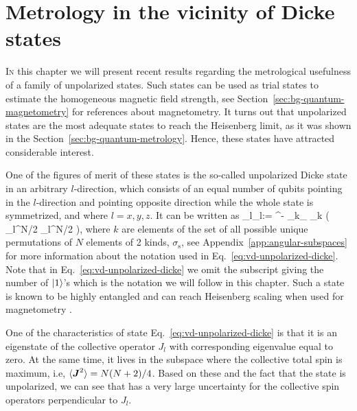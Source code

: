 \section{Metrology in the vicinity of Dicke states}
\label{sec:vd}



\lettrine[lines=2, findent=3pt,nindent=0pt]{I}{n} this chapter we will present recent results regarding the metrological usefulness of a family of unpolarized states.
Such states can be used as trial states to estimate the homogeneous magnetic field strength, see Section~\ref{sec:bg-quantum-magnetometry} for references about magnetometry.
It turns out that unpolarized states are the most adequate states to reach the Heisenberg limit, as it was shown in the Section~\ref{sec:bg-quantum-metrology}.
Hence, these states have attracted considerable interest.

One of the figures of merit of these states is the so-called unpolarized Dicke state \cite{Dicke1954} in an arbitrary $l$-direction, which consists of an equal number of qubits pointing in the $l$-direction and pointing opposite direction while the whole state is symmetrized, and where $l=x,y,z$.
It can be written as
\be
   _l\equiv {}_l:= ^{-}
  \sum_{k\in \sigma_}
  _{k} ( _l^{\otimes N/2} _l^{\otimes N/2} ),
  \label{eq:vd-unpolarized-dicke}
\ee
where $k$ are elements of the set of all possible unique permutations of $N$ elements of 2 kinds, $\sigma_\text{s}$, see Appendix~\ref{app:angular-subspaces} for more information about the notation used in Eq.~\eqref{eq:vd-unpolarized-dicke}.
Note that in Eq.~\eqref{eq:vd-unpolarized-dicke} we omit the subscript giving the number of $\vert{1}\rangle$'s which is the notation we will follow in this chapter.
Such a state is known to be highly entangled \cite{Toth2007, Toth2009a} and can reach Heisenberg scaling when used for magnetometry \cite{Holland1993}.

One of the characteristics of state Eq.~\eqref{eq:vd-unpolarized-dicke} is that it is an eigenstate of the collective operator $J_l$ with corresponding eigenvalue equal to zero.
At the same time, it lives in the subspace where the collective total spin is maximum, i.e, $\langle{\ensuremath{\boldsymbol{J}}^2}\rangle=N(N+2)/4$.
Based on these and the fact that the state is unpolarized, we can see that has a very large uncertainty for the collective spin operators perpendicular to $J_l$.

